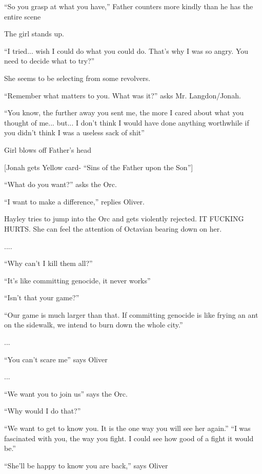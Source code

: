 ``So you grasp at what you have,'' Father counters more kindly than he has the entire scene

The girl stands up.

``I tried... wish I could do what you could do. That's why I was so angry.  You need to decide what to try?''

She seems to be selecting from some revolvers.

``Remember what matters to you.  What was it?'' asks Mr. Langdon/Jonah.

``You know, the further away you sent me, the more I cared about what you thought of me... but... I don't think I would have done anything worthwhile if you didn't think I was a useless sack of shit''

Girl blows off Father's head



{[}Jonah gets Yellow card- ``Sins of the Father upon the Son''{]}




``What do you want?'' asks the Orc.

``I want to make a difference,'' replies Oliver.



Hayley tries to jump into the Orc and gets violently rejected.  IT FUCKING HURTS.  She can feel the attention of Octavian bearing down on her.

....

``Why can't I kill them all?''

``It's like committing genocide, it never works''

``Isn't that your game?''

``Our game is much larger than that. If committing genocide is like frying an ant on the sidewalk, we intend to burn down the whole city.''

...

``You can't scare me'' says Oliver

...

``We want you to join us'' says the Orc.

``Why would I do that?''

``We want to get to know you.  It is the one way you will see her again.'' ``I was fascinated with you, the way you fight.  I could see how good of a fight it would be.''

``She'll be happy to know you are back,'' says Oliver

